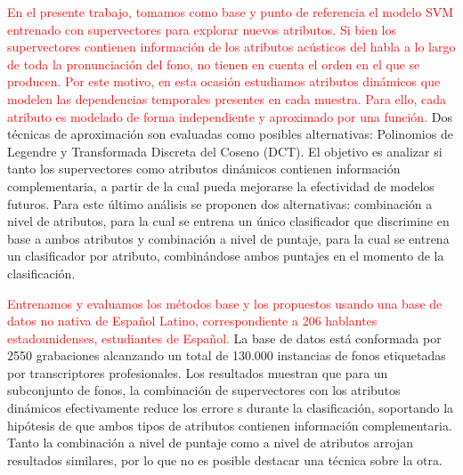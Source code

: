 \textcolor{red}{
En el presente trabajo, tomamos como
base y punto de referencia el modelo SVM entrenado con
supervectores para explorar nuevos atributos.
Si bien los supervectores contienen información de los atributos acústicos del habla a lo
largo de toda la pronunciación del fono, no tienen en cuenta el orden en el que se
producen. Por este motivo, en esta ocasión estudiamos atributos dinámicos
que modelen las dependencias temporales presentes en cada muestra. Para ello, cada
atributo es modelado de forma independiente y aproximado por una función.
}
Dos técnicas de aproximación son evaluadas como posibles alternativas:
Polinomios de Legendre y Transformada Discreta del Coseno (DCT).
El objetivo
es analizar si tanto los supervectores como atributos dinámicos
contienen información complementaria,
a partir de la cual pueda mejorarse la efectividad de modelos futuros.
Para este último análisis
se proponen dos alternativas: combinación a nivel de atributos,
para la cual se entrena un único clasificador que discrimine en base a ambos atributos
y combinación a nivel de puntaje,
para la cual se entrena un clasificador por atributo, combinándose ambos puntajes
en el momento de la clasificación.


\textcolor{red}{
Entrenamos y evaluamos los métodos base y los propuestos usando una base de datos no nativa
de Español Latino, correspondiente a 206 hablantes estadounidenses, estudiantes de Español.}
La base de datos está conformada por 2550 grabaciones alcanzando
un total de 130.000 instancias de fonos etiquetadas
por transcriptores profesionales.
Los resultados muestran que para un subconjunto de fonos, la combinación de supervectores
con los atributos dinámicos efectivamente reduce los errore s durante la clasificación,
soportando la
hipótesis de que ambos tipos de atributos contienen información complementaria.
Tanto la combinación a nivel de puntaje como a nivel de atributos
arrojan resultados similares, por
lo que no es posible destacar una técnica sobre la otra.

